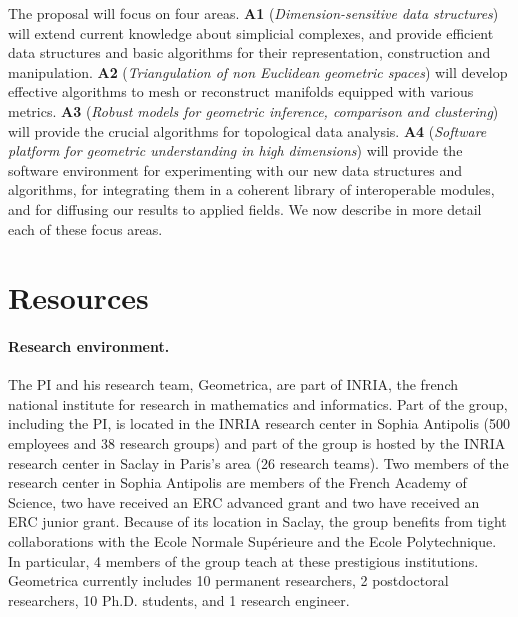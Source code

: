 The proposal will focus on four areas. {\bf  A1}  ({\em Dimension-sensitive data  structures}) will extend current knowledge about simplicial complexes, and  provide efficient data structures and basic algorithms for their representation, construction and manipulation. 
  {\bf A2}  ({\em Triangulation of non Euclidean geometric spaces})  will develop effective algorithms to mesh or reconstruct manifolds equipped with various metrics.   {\bf A3} ({\em Robust models for geometric inference, comparison and  clustering}) will provide the crucial  algorithms for topological data analysis.
 {\bf A4}  ({\em  Software platform for geometric understanding in high dimensions}) will provide the software environment for experimenting with our new data structures and algorithms, for integrating them in a coherent library of interoperable modules, and for diffusing our results to applied fields. We now describe in more detail each of these focus areas.









\section{Resources}

\paragraph{Research environment.}
The PI and his research team, Geometrica, are part of INRIA, the french national institute for research in mathematics and informatics. Part of the group, including the PI, is located in the INRIA research center in Sophia Antipolis  (500 employees and 38 research groups) and part of the group is hosted by the INRIA research center in Saclay in Paris's area (26 research teams). Two members of the research center in Sophia Antipolis are members of the French Academy of Science, two have received an ERC advanced grant and two have received an ERC junior grant. Because of its location in Saclay, the group benefits from tight collaborations with the Ecole Normale Sup\'erieure and the Ecole Polytechnique. In particular, 4 members of the group teach at these prestigious institutions. Geometrica currently includes 10 permanent researchers,  2 postdoctoral researchers, 10 Ph.D. students, and 1 research engineer. 

